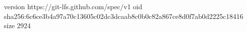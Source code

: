 version https://git-lfs.github.com/spec/v1
oid sha256:6c6ce3b4a97a70c13605c02dc3dcaab8c0b0c82a867ce8d0f7ab0d2225c18416
size 2924
